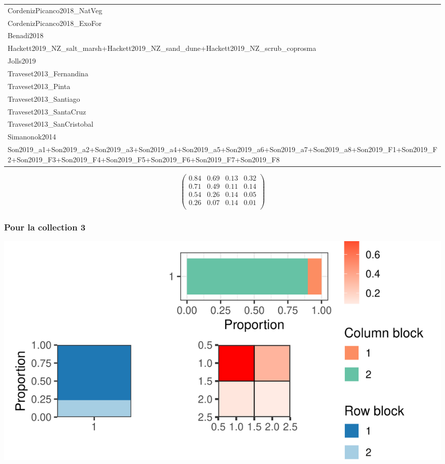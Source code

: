 \begin{tabular}{l}
CordenizPicanco2018\_NatVeg\\
CordenizPicanco2018\_ExoFor\\
\addlinespace
Benadi2018\\
Hackett2019\_NZ\_salt\_marsh+Hackett2019\_NZ\_sand\_dune+Hackett2019\_NZ\_scrub\_coprosma\\
Jolls2019\\
Traveset2013\_Fernandina\\
Traveset2013\_Pinta\\
\addlinespace
Traveset2013\_Santiago\\
Traveset2013\_SantaCruz\\
Traveset2013\_SanCristobal\\
Simanonok2014\\
Son2019\_a1+Son2019\_a2+Son2019\_a3+Son2019\_a4+Son2019\_a5+Son2019\_a6+Son2019\_a7+Son2019\_a8+Son2019\_F1+Son2019\_F2+Son2019\_F3+Son2019\_F4+Son2019\_F5+Son2019\_F6+Son2019\_F7+Son2019\_F8\\
\bottomrule
\end{tabular}

\normalsize\newline\[\begin{pmatrix} 0.84 &0.69 &0.13 &0.32 \\0.71 &0.49 &0.11 &0.14 \\0.54 &0.26 &0.14 &0.05 \\0.26 &0.07 &0.14 &0.01 \\ \end{pmatrix}\]

\subsubsection{Pour la collection 3 }

\includegraphics{./img/e69b18419936d1e08301cce4cb1c78acba2044c4.png}\newline \tiny


